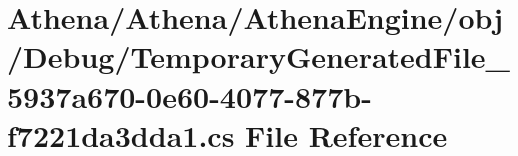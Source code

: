\hypertarget{_athena_engine_2obj_2_debug_2_temporary_generated_file__5937a670-0e60-4077-877b-f7221da3dda1_8cs}{\section{Athena/\-Athena/\-Athena\-Engine/obj/\-Debug/\-Temporary\-Generated\-File\-\_\-5937a670-\/0e60-\/4077-\/877b-\/f7221da3dda1.cs File Reference}
\label{_athena_engine_2obj_2_debug_2_temporary_generated_file__5937a670-0e60-4077-877b-f7221da3dda1_8cs}
}
